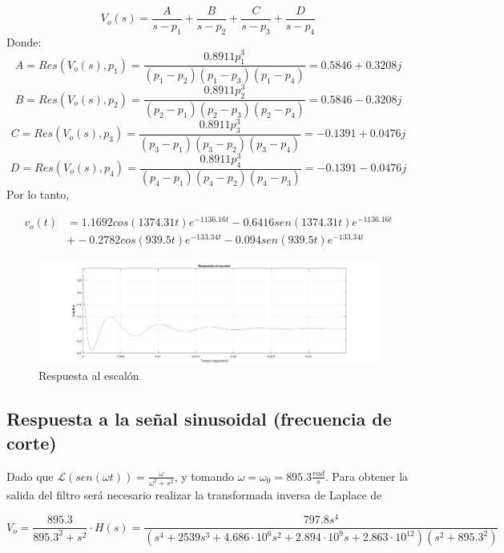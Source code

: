 $$
V_o(s) = \frac{A}{s-p_1} + \frac{B}{s-p_2} + \frac{C}{s-p_3} + \frac{D}{s-p_4}
$$
\vskip0.5cm
Donde:
$$
A = Res(V_o(s), p_1) = \frac{0.8911 p_1^3}{(p_1-p_2)(p_1-p_3)(p_1-p_4)} = 0.5846 + 0.3208j
$$
$$
B = Res(V_o(s), p_2) = \frac{0.8911 p_2^3}{(p_2-p_1)(p_2-p_3)(p_2-p_4)} = 0.5846 - 0.3208j
$$
$$
C = Res(V_o(s), p_3) = \frac{0.8911 p_3^3}{(p_3-p_1)(p_3-p_2)(p_3-p_4)} = -0.1391 + 0.0476j
$$
$$
D = Res(V_o(s), p_4) = \frac{0.8911 p_4^3}{(p_4-p_1)(p_4-p_2)(p_4-p_3)} = -0.1391 - 0.0476j
$$
\vskip0.5cm
Por lo tanto,

\begin{align*}
    v_o(t) & = 1.1692cos(1374.31t)e^{-1136.16t} - 0.6416sen(1374.31t)e^{-1136.16t}\\
           & + -0.2782cos(939.5t)e^{-133.34t} -0.094sen(939.5t)e^{-133.34t}
\end{align*}

\begin{figure}[H]
    \centering
    \includegraphics[width=1\textwidth]{resources/RespuestaAlEscalon.png}
    \caption{Respuesta al escalón}
\end{figure}


\subsection{Respuesta a la señal sinusoidal (frecuencia de corte)}
Dado que $\mathcal{L}(sen(\omega t)) = \frac{\omega}{\omega^2+s^2}$, y tomando $\omega = \omega_0 = 895.3 \frac{rad}{s}$. Para obtener la salida del filtro será necesario realizar la transformada inversa de Laplace de

$$
    V_o = \frac{895.3}{895.3^2+s^2} \cdot H(s) = \frac{797.8 s^4}{(s^4 + 2539 s^3 + 4.686 \cdot 10^6 s^2 + 2.894 \cdot 10^9 s + 2.863 \cdot 10^{12})(s^2+895.3^2)}
$$


